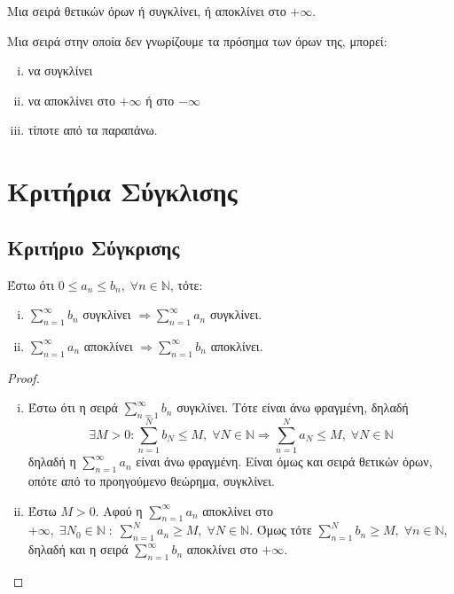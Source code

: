 \documentclass[main.tex]{subfiles}
\begin{document}
\begin{cor}
    Μια σειρά θετικών όρων ή συγκλίνει, ή αποκλίνει στο $ + \infty $.  
\end{cor}

\begin{rem}
    Μια σειρά στην οποία δεν γνωρίζουμε τα πρόσημα των όρων της, μπορεί:
    \begin{enumerate}[i)]
        \item να συγκλίνει
        \item να αποκλίνει στο $ + \infty $ ή στο $ - \infty $
        \item τίποτε από τα παραπάνω.
    \end{enumerate}
\end{rem}



\section{Κριτήρια Σύγκλισης}

\subsection{Κριτήριο Σύγκρισης}
Έστω ότι $ 0 \leq a_{n} \leq b_{n}, \; \forall n \in \mathbb{N} $, τότε:
\begin{enumerate}[i)]
    \item $ \sum_{n=1}^{\infty} b_{n} $ συγκλίνει $ \Rightarrow \sum_{n=1}^{\infty} 
        a_{n}$ συγκλίνει.
    \item $ \sum_{n=1}^{\infty} a_{n} $ αποκλίνει $ \Rightarrow \sum_{n=1}^{\infty} 
        b_{n} $ αποκλίνει.
\end{enumerate}
\begin{proof}
\item {}
    \begin{enumerate}[i)]
        \item Έστω ότι η σειρά $ \sum_{n=1}^{\infty} b_{n} $ συγκλίνει. Τότε είναι 
            άνω φραγμένη, δηλαδή 
            \[
                \exists M>0 : \sum_{n=1}^{N} b_{N} \leq M, \; \forall N \in \mathbb{N}
                \Rightarrow \sum_{n=1}^{N} a_{N} \leq M, \; \forall N \in \mathbb{N}
            \]
            δηλαδή η $ \sum_{n=1}^{\infty} a_{n} $ είναι άνω φραγμένη. Είναι όμως και 
            σειρά θετικών όρων, οπότε από το προηγούμενο θεώρημα, συγκλίνει.

        \item Έστω $ M >0 $. Αφού η $ \sum_{n=1}^{\infty} a_{n} $ αποκλίνει στο $ 
            + \infty, \; \exists N_{0} \in \mathbb{N} \; : \; \sum_{n=1}^{N} a_{n} 
            \geq M, \; \forall N \in \mathbb{N} $. 
            Όμως τότε $ \sum_{n=1}^{N} b_{n} \geq M, \; \forall n \in \mathbb{N} $, 
            δηλαδή και η σειρά $ \sum_{n=1}^{\infty} b_{n} $ αποκλίνει στο $ 
            + \infty$.
    \end{enumerate}
\end{proof}
\end{document}
